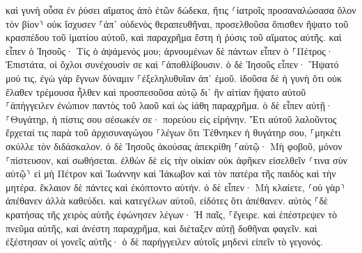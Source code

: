 \documentclass[twoside, 9pt]{extreport}
\begin{document}
καὶ γυνὴ οὖσα ἐν ῥύσει αἵματος ἀπὸ ἐτῶν δώδεκα, ἥτις ⸂ἰατροῖς προσαναλώσασα ὅλον τὸν βίον⸃ οὐκ ἴσχυσεν ⸀ἀπ᾽ οὐδενὸς θεραπευθῆναι, 
προσελθοῦσα ὄπισθεν ἥψατο τοῦ κρασπέδου τοῦ ἱματίου αὐτοῦ, καὶ παραχρῆμα ἔστη ἡ ῥύσις τοῦ αἵματος αὐτῆς. 
καὶ εἶπεν ὁ Ἰησοῦς· Τίς ὁ ἁψάμενός μου; ἀρνουμένων δὲ πάντων εἶπεν ὁ ⸀Πέτρος· Ἐπιστάτα, οἱ ὄχλοι συνέχουσίν σε καὶ ⸀ἀποθλίβουσιν. 
ὁ δὲ Ἰησοῦς εἶπεν· Ἥψατό μού τις, ἐγὼ γὰρ ἔγνων δύναμιν ⸀ἐξεληλυθυῖαν ἀπ᾽ ἐμοῦ. 
ἰδοῦσα δὲ ἡ γυνὴ ὅτι οὐκ ἔλαθεν τρέμουσα ἦλθεν καὶ προσπεσοῦσα αὐτῷ δι᾽ ἣν αἰτίαν ἥψατο αὐτοῦ ⸀ἀπήγγειλεν ἐνώπιον παντὸς τοῦ λαοῦ καὶ ὡς ἰάθη παραχρῆμα. 
ὁ δὲ εἶπεν αὐτῇ· ⸀Θυγάτηρ, ἡ πίστις σου σέσωκέν σε· πορεύου εἰς εἰρήνην. 
Ἔτι αὐτοῦ λαλοῦντος ἔρχεταί τις παρὰ τοῦ ἀρχισυναγώγου ⸀λέγων ὅτι Τέθνηκεν ἡ θυγάτηρ σου, ⸀μηκέτι σκύλλε τὸν διδάσκαλον. 
ὁ δὲ Ἰησοῦς ἀκούσας ἀπεκρίθη ⸀αὐτῷ· Μὴ φοβοῦ, μόνον ⸀πίστευσον, καὶ σωθήσεται. 
ἐλθὼν δὲ εἰς τὴν οἰκίαν οὐκ ἀφῆκεν εἰσελθεῖν ⸂τινα σὺν αὐτῷ⸃ εἰ μὴ Πέτρον καὶ Ἰωάννην καὶ Ἰάκωβον καὶ τὸν πατέρα τῆς παιδὸς καὶ τὴν μητέρα. 
ἔκλαιον δὲ πάντες καὶ ἐκόπτοντο αὐτήν. ὁ δὲ εἶπεν· Μὴ κλαίετε, ⸂οὐ γὰρ⸃ ἀπέθανεν ἀλλὰ καθεύδει. 
καὶ κατεγέλων αὐτοῦ, εἰδότες ὅτι ἀπέθανεν. 
αὐτὸς ⸀δὲ κρατήσας τῆς χειρὸς αὐτῆς ἐφώνησεν λέγων· Ἡ παῖς, ⸀ἔγειρε. 
καὶ ἐπέστρεψεν τὸ πνεῦμα αὐτῆς, καὶ ἀνέστη παραχρῆμα, καὶ διέταξεν αὐτῇ δοθῆναι φαγεῖν. 
καὶ ἐξέστησαν οἱ γονεῖς αὐτῆς· ὁ δὲ παρήγγειλεν αὐτοῖς μηδενὶ εἰπεῖν τὸ γεγονός. 
\end{document}

